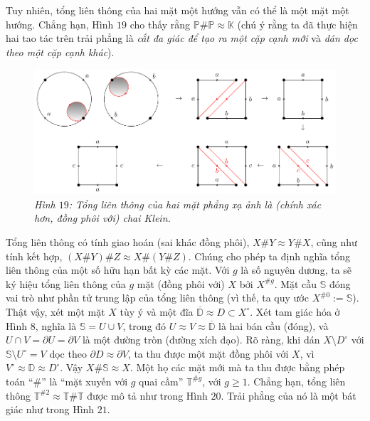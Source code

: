 \begin{multicols}{2}
\begin{center}
	\end{center}
	Tuy nhiên, tổng liên thông của hai mặt một hướng vẫn có thể là một mặt một hướng. Chẳng hạn, Hình $19$ cho thấy rằng $\mathbb{P} \# \mathbb{P} \approx \mathbb{K}$ (chú ý rằng ta đã thực hiện hai tao tác trên trải phẳng là {\it cắt đa giác để tạo ra một cặp cạnh mới} và {\it dán dọc theo một cặp cạnh khác}). 
	\begin{figure}[H]
		\vspace*{-5pt}
		\centering\captionsetup{labelformat=empty, justification=centering}
		\includegraphics[width=1\linewidth]{H19.pdf}
		\caption{\small\textit{\color{duongvaotoanhoc}Hình $19$: Tổng liên thông của hai mặt phẳng xạ ảnh là (chính xác hơn, đồng phôi với) chai Klein.}}
		\vspace*{-10pt}
	\end{figure}
	Tổng liên thông có tính giao hoán (sai khác đồng phôi), $X \# Y \approx Y \# X$, cũng như tính kết hợp, $(X \# Y) \# Z \approx X \# (Y \# Z)$. Chúng cho phép ta định nghĩa tổng liên thông của một số hữu hạn bất kỳ các mặt. Với $g$ là số nguyên dương, ta sẽ ký hiệu tổng liên thông của $g$ mặt (đồng phôi với) $X$ bởi $X^{\# g}$. Mặt cầu $\mathbb{S}$ đóng vai trò như phần tử trung lập của tổng liên thông (vì thế, ta quy ước $X^{\# 0} := \mathbb{S}$). Thật vậy, xét một mặt $X$ tùy ý và một đĩa $\overline{\mathbb{D}} \approx D \subset X^\circ$. Xét tam giác hóa ở Hình $8$, nghĩa là $\mathbb{S} = U \cup V$, trong đó $U \approx V \approx \overline{\mathbb{D}}$ là hai bán cầu (đóng), và $U \cap V = \partial U = \partial V$ là một đường tròn (đường xích đạo). Rõ ràng, khi dán $X \setminus D^\circ$ với $\mathbb{S} \setminus U^\circ = V$ dọc theo $\partial D \approx \partial V$, ta thu được một mặt đồng phôi với $X$, vì $V^\circ \approx \mathbb{D} \approx D^\circ$. Vậy $X \# \mathbb{S} \approx X$.
	\vskip 0.1cm
	Một họ các mặt mới mà ta thu được bằng phép toán ``$\#$'' là ``mặt xuyến với $g$ quai cầm'' $\mathbb{T}^{\# g}$, với $g \ge 1$. Chẳng hạn, tổng liên thông $\mathbb{T}^{\#2} \approx \mathbb{T} \# \mathbb{T}$ được mô tả như trong Hình $20$. Trải phẳng của nó là một bát giác như trong Hình $21$.

\end{multicols}
